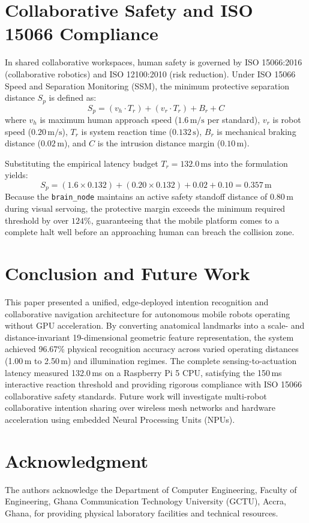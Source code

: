 \documentclass[journal]{IEEEtran}
\begin{document}
\section{Collaborative Safety and ISO 15066 Compliance}
In shared collaborative workspaces, human safety is governed by ISO 15066:2016 (collaborative robotics) and ISO 12100:2010 (risk reduction). Under ISO 15066 Speed and Separation Monitoring (SSM), the minimum protective separation distance $S_p$ is defined as:
\begin{equation}
S_p = (v_h \cdot T_r) + (v_r \cdot T_r) + B_r + C
\end{equation}
where $v_h$ is maximum human approach speed ($1.6\,\text{m/s}$ per standard), $v_r$ is robot speed ($0.20\,\text{m/s}$), $T_r$ is system reaction time ($0.132\,\text{s}$), $B_r$ is mechanical braking distance ($0.02\,\text{m}$), and $C$ is the intrusion distance margin ($0.10\,\text{m}$).

Substituting the empirical latency budget $T_r = 132.0\,\text{ms}$ into the formulation yields:
\begin{equation}
S_p = (1.6 \times 0.132) + (0.20 \times 0.132) + 0.02 + 0.10 = 0.357\,\text{m}
\end{equation}
Because the \texttt{brain\_node} maintains an active safety standoff distance of $0.80\,\text{m}$ during visual servoing, the protective margin exceeds the minimum required threshold by over $124\%$, guaranteeing that the mobile platform comes to a complete halt well before an approaching human can breach the collision zone.

\section{Conclusion and Future Work}
This paper presented a unified, edge-deployed intention recognition and collaborative navigation architecture for autonomous mobile robots operating without GPU acceleration. By converting anatomical landmarks into a scale- and distance-invariant 19-dimensional geometric feature representation, the system achieved 96.67\% physical recognition accuracy across varied operating distances (1.00\,m to 2.50\,m) and illumination regimes. The complete sensing-to-actuation latency measured 132.0\,ms on a Raspberry Pi 5 CPU, satisfying the 150\,ms interactive reaction threshold and providing rigorous compliance with ISO 15066 collaborative safety standards. Future work will investigate multi-robot collaborative intention sharing over wireless mesh networks and hardware acceleration using embedded Neural Processing Units (NPUs).

\section*{Acknowledgment}
The authors acknowledge the Department of Computer Engineering, Faculty of Engineering, Ghana Communication Technology University (GCTU), Accra, Ghana, for providing physical laboratory facilities and technical resources.



\end{document}
